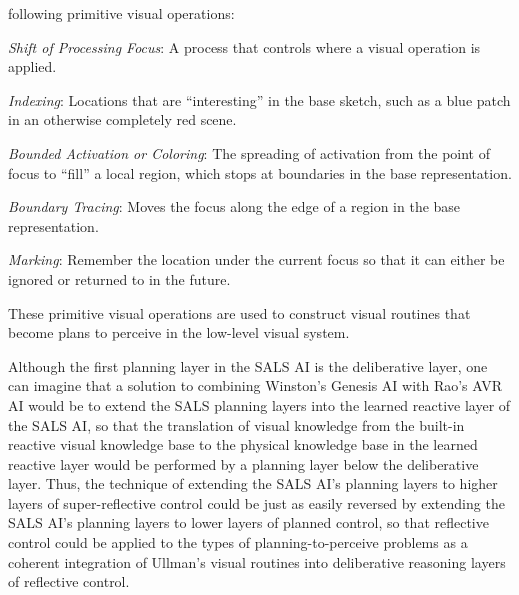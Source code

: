 following primitive visual operations:
\begin{packed_enumerate}
\item{\emph{Shift of Processing Focus}: A process that controls where
  a visual operation is applied.}
\item{\emph{Indexing}: Locations that are ``interesting'' in the base
  sketch, such as a blue patch in an otherwise completely red scene.}
\item{\emph{Bounded Activation or Coloring}: The spreading of
  activation from the point of focus to ``fill'' a local region, which
  stops at boundaries in the base representation.}
\item{\emph{Boundary Tracing}: Moves the focus along the edge of a
  region in the base representation.}
\item{\emph{Marking}: Remember the location under the current focus so
  that it can either be ignored or returned to in the future.}
\end{packed_enumerate}
These primitive visual operations are used to construct visual
routines that become plans to perceive
\cite[]{pryor:1992,pryorcollins:1995,velez:2011} in the low-level
visual system.

Although the first planning layer in the SALS AI is the deliberative
layer, one can imagine that a solution to combining Winston's Genesis
AI with Rao's AVR AI would be to extend the SALS planning layers into
the learned reactive layer of the SALS AI, so that the translation of
visual knowledge from the built-in reactive visual knowledge base to
the physical knowledge base in the learned reactive layer would be
performed by a planning layer below the deliberative layer.  Thus, the
technique of extending the SALS AI's planning layers to higher layers
of super-reflective control could be just as easily reversed by
extending the SALS AI's planning layers to lower layers of planned
control, so that reflective control could be applied to the types of
planning-to-perceive problems as a coherent integration of Ullman's
visual routines into deliberative reasoning layers of reflective
control.






